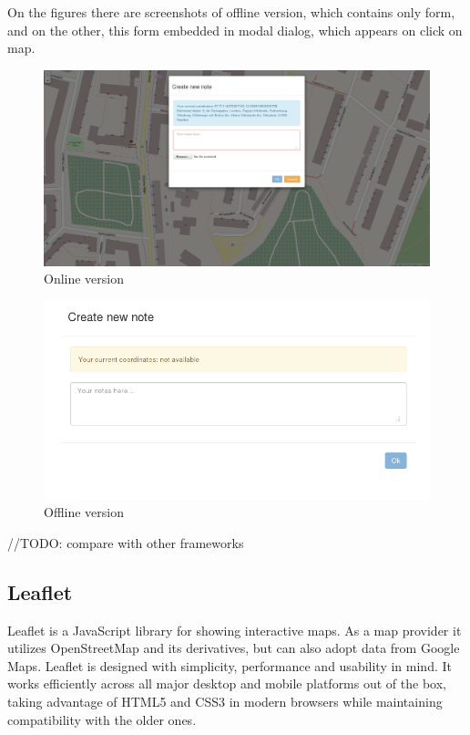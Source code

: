 \documentclass[12pt,a4paper]{article}
\begin{document}
On the figures there are screenshots of offline version, which contains only form,
and on the other, this form embedded in modal dialog, which appears on click on map.

    \begin{figure}[h]
      \begin{center}
        \includegraphics[width=\textwidth]{res/online}
      \end{center}
      \caption{Online version}
    \end{figure}

    \begin{figure}[h]
      \begin{center}
        \includegraphics[width=\textwidth]{res/offline}
      \end{center}
      \caption{Offline version}
    \end{figure}

//TODO: compare with other frameworks

\subsection{Leaflet}

Leaflet is a JavaScript library for showing interactive maps. As a map
provider it utilizes OpenStreetMap and its derivatives, but can also
adopt data from Google Maps. Leaflet is designed with simplicity,
performance and usability in mind. It works efficiently across all
major desktop and mobile platforms out of the box, taking advantage of
HTML5 and CSS3 in modern browsers while maintaining compatibility with
the older ones.
\end{document}
